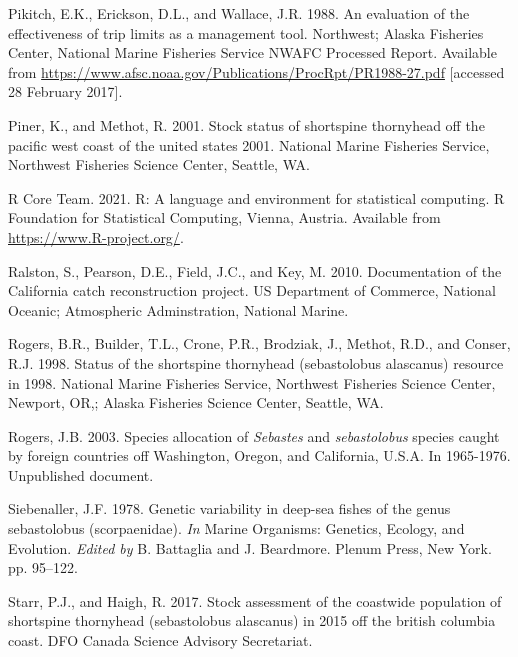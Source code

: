 \documentclass[11pt,
  letterpaper,
]{article}
\newlength{\cslhangindent}
\newenvironment{CSLReferences}[2] %
 {%
  \setlength{\parindent}{0pt}
  \ifodd #1 \everypar{\setlength{\hangindent}{\cslhangindent}}\ignorespaces\fi
  \ifnum #2 > 0
  \setlength{\parskip}{#2\baselineskip}
  \fi
 }%
 {}
\begin{document}
\begin{CSLReferences}{1}{0}
\leavevmode{}%
Pikitch, E.K., Erickson, D.L., and Wallace, J.R. 1988. An evaluation of the effectiveness of trip limits as a management tool. Northwest; Alaska Fisheries Center, National Marine Fisheries Service NWAFC Processed Report. Available from \url{https://www.afsc.noaa.gov/Publications/ProcRpt/PR1988-27.pdf} {[}accessed 28 February 2017{]}.

\leavevmode{}%
Piner, K., and Methot, R. 2001. Stock status of shortspine thornyhead off the pacific west coast of the united states 2001. National Marine Fisheries Service, Northwest Fisheries Science Center, Seattle, {WA}.

\leavevmode{}%
R Core Team. 2021. R: A language and environment for statistical computing. R Foundation for Statistical Computing, Vienna, Austria. Available from \url{https://www.R-project.org/}.

\leavevmode{}%
Ralston, S., Pearson, D.E., Field, J.C., and Key, M. 2010. Documentation of the {California} catch reconstruction project. US Department of Commerce, National Oceanic; Atmospheric Adminstration, National Marine.

\leavevmode{}%
Rogers, B.R., Builder, T.L., Crone, P.R., Brodziak, J., Methot, R.D., and Conser, R.J. 1998. Status of the shortspine thornyhead (sebastolobus alascanus) resource in 1998. National Marine Fisheries Service, Northwest Fisheries Science Center, Newport, {OR},; Alaska Fisheries Science Center, Seattle, {WA}.

\leavevmode{}%
Rogers, J.B. 2003. Species allocation of \emph{{Sebastes}} and \emph{sebastolobus} species caught by foreign countries off {Washington}, {Oregon}, and {California}, {U}.{S}.{A}. In 1965-1976. Unpublished document.

\leavevmode{}%
Siebenaller, J.F. 1978. Genetic variability in deep-sea fishes of the genus sebastolobus (scorpaenidae). \emph{In} Marine Organisms: Genetics, Ecology, and Evolution. \emph{Edited by} B. Battaglia and J. Beardmore. Plenum Press, New York. pp. 95--122.

\leavevmode{}%
Starr, P.J., and Haigh, R. 2017. Stock assessment of the coastwide population of shortspine thornyhead (sebastolobus alascanus) in 2015 off the british columbia coast. DFO Canada Science Advisory Secretariat.


\end{CSLReferences}
\end{document}
